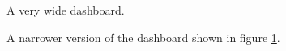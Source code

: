         \begin{figure}[!t]
            \centering
            \caption{A very wide dashboard.}\label{fig:screen_db_wide}
        \end{figure}

        \begin{figure}[!t]
            \centering
            \caption{A narrower version of the dashboard shown in figure \ref{fig:screen_db_wide}.}\label{fig:screen_db_resized}
        \end{figure}

